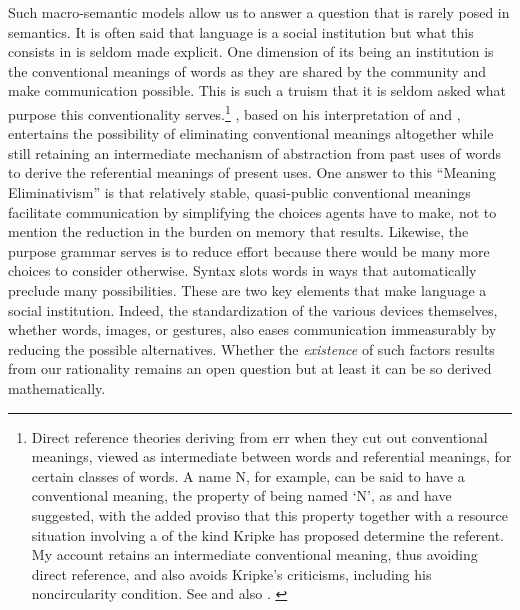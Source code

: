 Such macro-semantic models allow us to answer a question that is rarely posed in semantics. It is often said that language is a social institution but what this consists in is seldom made explicit. One dimension of its being an institution is the conventional meanings of words as they are shared by the community and make communication possible. This is such a truism that it is seldom asked what purpose this conventionality serves.\footnote{Direct reference theories deriving from \citet{kripke:nn} err when they cut out conventional meanings, viewed as intermediate between words and referential meanings, for certain classes of words. A name N, for example, can be said to have a conventional meaning, the property of being named `N', as \citet{kneale:un} and \citet{burge:rpn} have suggested, with the added proviso that this property together with a resource situation involving a  of the kind Kripke has proposed determine the referent. My account retains an intermediate conventional meaning, thus avoiding direct reference, and also avoids Kripke's criticisms, including his noncircularity condition. See \citet[20--21, 68--70]{kripke:nn} and also . \label{foot:kripke}} \citet[Sections~9.6--9.7]{recanati:lm}, based on his interpretation of \citet{wittgenstein:pi} and \citet{austin:t}, entertains the possibility of eliminating conventional meanings altogether while still retaining an intermediate mechanism of abstraction from past uses of words to derive the referential meanings of present uses. One answer to this ``Meaning Eliminativism'' is that relatively stable, quasi-public conventional meanings facilitate communication by simplifying the choices agents have to make, not to mention the reduction in the burden on memory that results. Likewise, the purpose grammar serves is to reduce effort because there would be many more choices to consider otherwise. Syntax slots words in ways that automatically preclude many possibilities. These are two key elements that make language a social institution. Indeed, the standardization of the various devices themselves, whether words, images, or gestures, also eases communication immeasurably by reducing the possible alternatives. Whether the \emph{existence} of such factors results from our rationality remains an open question but at least it can be so derived mathematically. 


